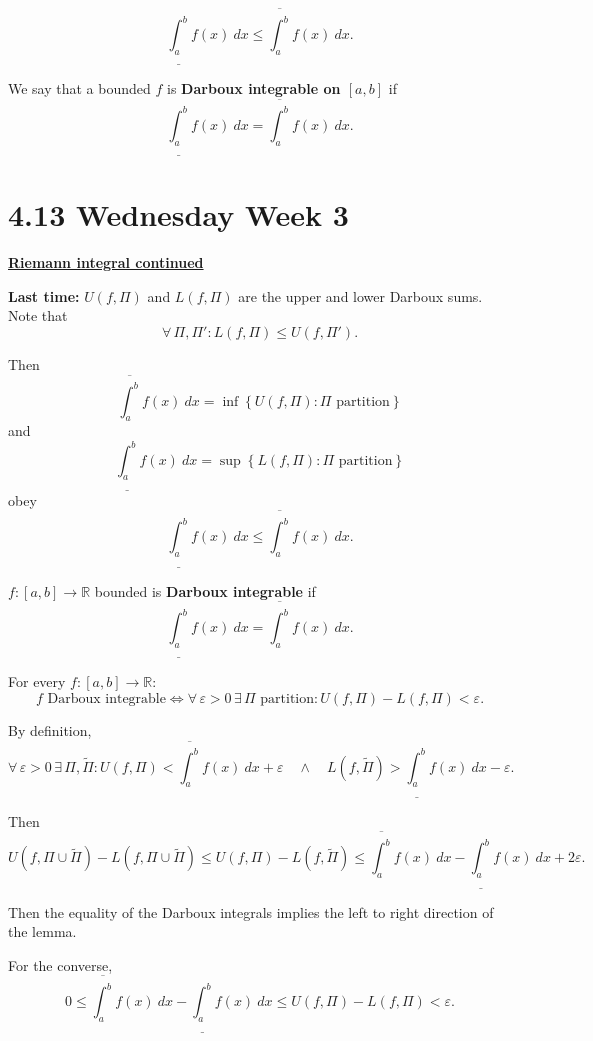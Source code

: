 \documentclass{notes}
\begin{document}
  \begin{note}
    \[
      \underline{\int_a^b} f(x)\ dx \leq \overline{\int_a^b} f(x)\ dx.
    \]
  \end{note}
  
  \begin{defn}
    We say that a bounded $f$ is {\boldmath \bfseries Darboux integrable on $[a, b]$} if 
    \[
      \underline{\int_a^b} f(x)\ dx = \overline{\int_a^b} f(x)\ dx.
    \]
  \end{defn}
  
  \section{4.13 Wednesday Week 3}
  
  {\boldmath \bfseries \underline{Riemann integral continued}}

  {\boldmath \bfseries Last time:} $U(f, \Pi)$ and $L(f, \Pi)$ are the upper and lower Darboux sums.
  Note that 
  \[
    \forall \, \Pi, \Pi': L(f, \Pi) \leq U(f, \Pi').
  \]
  
  Then 
  \[
    \overline{\int_a^b} f(x)\ dx = \inf \left \{ U(f, \Pi) : \text{$\Pi$ partition} \right \}
  \]
  and 
  \[
    \underline{\int_a^b} f(x)\ dx = \sup \left \{ L(f, \Pi) : \text{$\Pi$ partition} \right \}
  \]
  obey
  \[
    \underline{\int_a^b} f(x)\ dx \leq \overline{\int_a^b} f(x)\ dx.
  \]
  
  \newpage
  
  \begin{defn}
    $f \colon [a, b] \to \mathbb R$ bounded is {\boldmath \bfseries Darboux integrable} if 
    \[
      \underline{\int_a^b} f(x)\ dx = \overline{\int_a^b} f(x)\ dx.
    \]
  \end{defn}
  
  \begin{lem}
    For every $f \colon [a, b] \to \mathbb R$: 
    \[
      \text{$f$ Darboux integrable} \Leftrightarrow \forall \, \varepsilon > 0 \, \exists \, \Pi \text{ partition}: U(f, \Pi) - L(f, \Pi) < \varepsilon.
    \]
  \end{lem}
  
  \begin{prf}
    By definition, 
    \[
      \forall \, \varepsilon > 0 \, \exists \, \Pi, \tilde \Pi: U(f, \Pi) < \overline{\int_a^b} f(x)\ dx + \varepsilon \quad \land \quad L(f, \tilde \Pi) > \underline{\int_a^b} f(x)\ dx - \varepsilon.
    \]
    
    Then 
    \[
      U(f, \Pi \cup \tilde \Pi) - L(f, \Pi \cup \tilde \Pi) \leq U(f, \Pi) - L(f, \tilde \Pi) \leq \overline{\int_a^b} f(x)\ dx - \underline{\int_a^b} f(x)\ dx + 2 \varepsilon.
    \]
    
    Then the equality of the Darboux integrals implies the left to right direction of the lemma.
    
    For the converse, 
    \[
      0 \leq \overline{\int_a^b} f(x)\ dx - \underline{\int_a^b} f(x)\ dx \leq U(f, \Pi) - L(f, \Pi) < \varepsilon.
    \]
  \end{prf}
  
\end{document}

